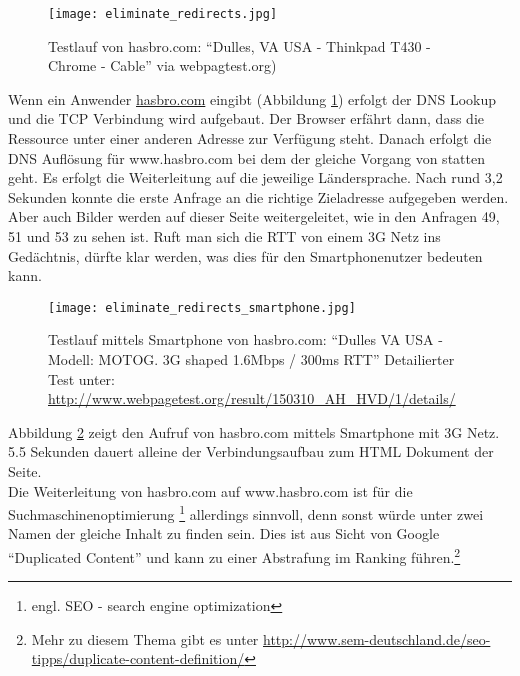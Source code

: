 \begin{itemize}
			\begin{figure}[htbp]
				\begin{center}
					\texttt{[image: eliminate\_redirects.jpg]}
					\caption{Testlauf von hasbro.com: "`Dulles, VA USA - Thinkpad T430 - Chrome - Cable"' via webpagtest.org)}
					\label{fig:eliminate_redirects}
				\end{center}
			\end{figure}
			
			Wenn ein Anwender \url{hasbro.com} eingibt (Abbildung \ref{fig:eliminate_redirects}) erfolgt der DNS Lookup und die TCP Verbindung wird aufgebaut. Der Browser erfährt dann, dass die Ressource unter einer anderen Adresse zur Verfügung steht. Danach erfolgt die DNS Auflösung für www.hasbro.com bei dem der gleiche Vorgang von statten geht. Es erfolgt die Weiterleitung auf die jeweilige Ländersprache. Nach rund 3,2 Sekunden konnte die erste Anfrage an die richtige Zieladresse aufgegeben werden. Aber auch Bilder werden auf dieser Seite weitergeleitet, wie in den Anfragen 49, 51 und 53 zu sehen ist. Ruft man sich die RTT von einem 3G Netz ins Gedächtnis, dürfte klar werden, was dies für den Smartphonenutzer bedeuten kann. \\

			\begin{figure}[htbp]
				\begin{center}
					\texttt{[image: eliminate\_redirects\_smartphone.jpg]}
					\caption{Testlauf mittels Smartphone von hasbro.com: "`Dulles VA USA - Modell: MOTOG. 3G shaped 1.6Mbps / 300ms RTT"' Detailierter Test unter: \url{http://www.webpagetest.org/result/150310_AH_HVD/1/details/}}
					\label{fig:eliminate_redirects_smartphone}
				\end{center}
			\end{figure}

			Abbildung \ref{fig:eliminate_redirects_smartphone} zeigt den Aufruf von hasbro.com mittels Smartphone mit 3G Netz. 5.5 Sekunden dauert alleine der Verbindungsaufbau zum HTML Dokument der Seite.\\

			Die Weiterleitung von hasbro.com auf www.hasbro.com ist für die Suchmaschinenoptimierung \footnote{engl. SEO - search engine optimization} allerdings sinnvoll, denn sonst würde unter zwei Namen der gleiche Inhalt zu finden sein. Dies ist aus Sicht von Google "`Duplicated Content"' und kann zu einer Abstrafung im Ranking führen.\footnote{Mehr zu diesem Thema gibt es unter \url{http://www.sem-deutschland.de/seo-tipps/duplicate-content-definition/}}


\end{itemize}
